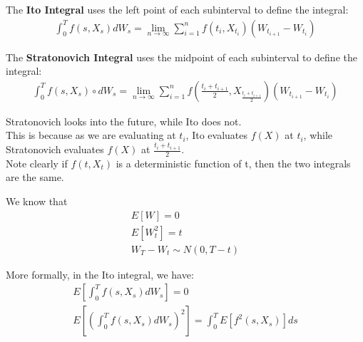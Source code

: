 \begin{definition}
    The \textbf{Ito Integral} uses the left point of each subinterval to define the integral:
    \begin{align*}
        \int_0^T f(s, X_s)dW_s = \lim_{n \to \infty} \sum_{i=1}^{n} f(t_{i}, X_{t_{i}}) (W_{t_{i+1}} - W_{t_{i}})
    \end{align*}
\end{definition}

\begin{definition}
    The \textbf{Stratonovich Integral} uses the midpoint of each subinterval to define the integral:
    \begin{align*}
        \int_0^T f(s, X_s) \circ dW_s = \lim_{n \to \infty} \sum_{i=1}^{n} f(\frac{t_{i} + t_{i+1}}{2}, X_{\frac{t_{i} + t_{i+1}}{2}}) (W_{t_{i+1}} - W_{t_{i}})
    \end{align*}
\end{definition}

\begin{remark}
Stratonovich looks into the future, while Ito does not.\\
This is because as we are evaluating at $t_{i}$, Ito evaluates $f(X)$ at $t_{i}$, while Stratonovich evaluates $f(X)$ at $\frac{t_{i} + t_{i+1}}{2}$.\\ 
Note clearly if $f(t, X_t)$ is a deterministic function of t, then the two integrals are the same.
\end{remark}

We know that 
\begin{align*}
    E[W] = 0\\
    E[W_t^2] = t\\
    W_T - W_t \sim N(0, T-t)
\end{align*}

More formally, in the Ito integral, we have:
\begin{align*}
    E\left[\int_0^T f(s, X_s)dW_s\right] = 0\\
    E\left[(\int_0^T f(s, X_s)dW_s)^2\right] = \int_0^T E\left[f^2(s, X_s) \right]ds
\end{align*}

